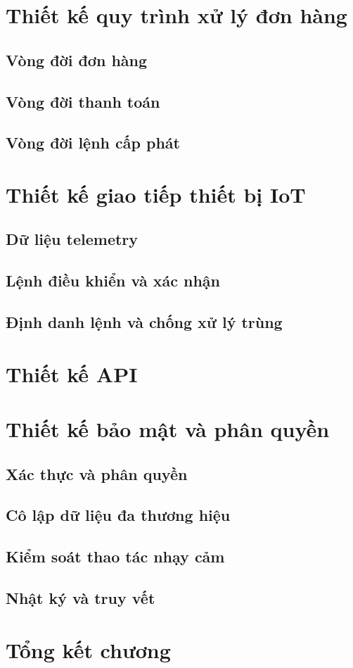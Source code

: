\section{Thiết kế quy trình xử lý đơn hàng}
\subsection{Vòng đời đơn hàng}
\subsection{Vòng đời thanh toán}
\subsection{Vòng đời lệnh cấp phát}
\section{Thiết kế giao tiếp thiết bị IoT}
\subsection{Dữ liệu telemetry}
\subsection{Lệnh điều khiển và xác nhận}
\subsection{Định danh lệnh và chống xử lý trùng}
\section{Thiết kế API}
\section{Thiết kế bảo mật và phân quyền}
\subsection{Xác thực và phân quyền}
\subsection{Cô lập dữ liệu đa thương hiệu}
\subsection{Kiểm soát thao tác nhạy cảm}
\subsection{Nhật ký và truy vết}
\section{Tổng kết chương}
